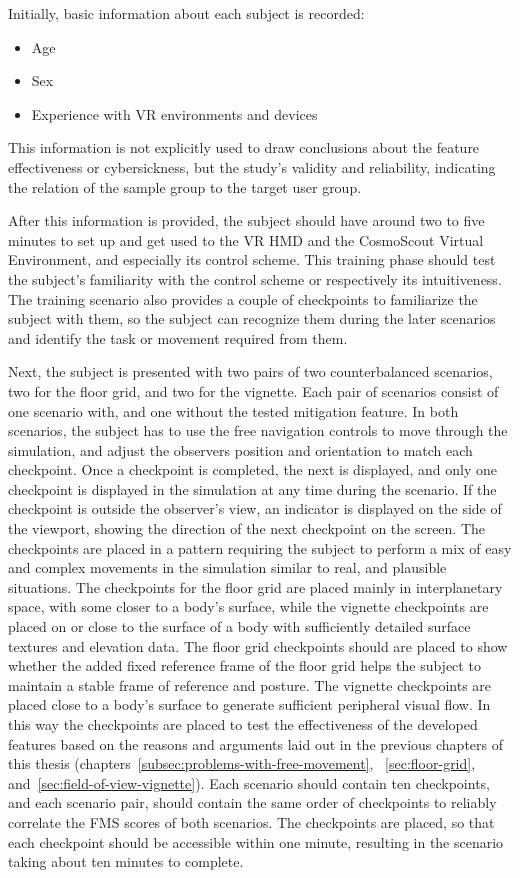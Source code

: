 Initially, basic information about each subject is recorded:
\begin{itemize}
    \item Age
    \item Sex
    \item Experience with VR environments and devices
\end{itemize}
This information is not explicitly used to draw conclusions about the feature effectiveness or cybersickness, but
the study's validity and reliability, indicating the relation of the sample group to the target user group.

After this information is provided, the subject should have around two to five minutes to set up and get used to the
VR HMD and the CosmoScout Virtual Environment, and especially its control scheme.
This training phase should test the subject's familiarity with the control scheme or respectively its intuitiveness.
The training scenario also provides a couple of checkpoints to familiarize the subject with them, so the subject
can recognize them during the later scenarios and identify the task or movement required from them.

Next, the subject is presented with two pairs of two counterbalanced scenarios, two for the floor grid, and two for the
vignette.
Each pair of scenarios consist of one scenario with, and one without the tested mitigation feature.
In both scenarios, the subject has to use the free navigation controls to move through the simulation, and adjust
the observers position and orientation to match each checkpoint.
Once a checkpoint is completed, the next is displayed, and only one checkpoint is displayed in the simulation at any
time during the scenario.
If the checkpoint is outside the observer's view, an indicator is displayed on the side of the viewport, showing the
direction of the next checkpoint on the screen.
The checkpoints are placed in a pattern requiring the subject to perform a mix of easy and complex movements in the
simulation similar to real, and plausible situations.
The checkpoints for the floor grid are placed mainly in interplanetary space, with some closer to a body's surface,
while the vignette checkpoints are placed on or close to the surface of a body with sufficiently detailed surface
textures and elevation data.
The floor grid checkpoints should are placed to show whether the added fixed reference frame of the floor grid helps the
subject to maintain a stable frame of reference and posture.
The vignette checkpoints are placed close to a body's surface to generate sufficient peripheral visual flow.
In this way the checkpoints are placed to test the effectiveness of the developed features based on the reasons and
arguments laid out in the previous chapters of this thesis (chapters~\ref{subsec:problems-with-free-movement},
~\ref{sec:floor-grid}, and~\ref{sec:field-of-view-vignette}).
Each scenario should contain ten checkpoints, and each scenario pair, should contain the same order of checkpoints to
reliably correlate the FMS scores of both scenarios.
The checkpoints are placed, so that each checkpoint should be accessible within one minute, resulting in the scenario
taking about ten minutes to complete.

